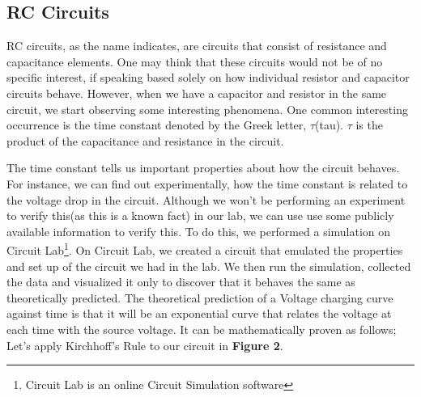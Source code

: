 \documentclass[twocolumn]{article}\usepackage[english]{babel}
\begin{document}
\subsection{RC Circuits}
RC circuits, as the name indicates, are circuits that consist of resistance and capacitance elements. One may think that these circuits would not be of no specific interest, if speaking based solely on how individual resistor and capacitor circuits behave. However, when we have a capacitor and resistor in the same circuit, we start observing some interesting phenomena. One common interesting occurrence is the time constant denoted by the Greek letter, $\tau$(tau). $\tau$ is the product of the capacitance and resistance in the circuit.
\newline
\newline
\newline
{}
\newline
\newline
\newline

The time constant tells us important properties about how the circuit behaves. For instance, we can find out experimentally, how the time constant is related to the voltage drop in the circuit. Although we won't be performing an experiment to verify this(as this is a known fact) in our lab, we can use use some publicly available information to verify this. To do this, we performed a simulation on Circuit Lab\footnote{Circuit Lab is an online Circuit Simulation software}. On Circuit Lab, we created a circuit that emulated the properties and set up of the circuit we had in the lab. We then run the simulation, collected the data and visualized it only to discover that it behaves the same as theoretically predicted.
\newline
\newline
The theoretical prediction of a Voltage charging curve against time is that it will be an exponential curve that relates the voltage at each time with the source voltage. It can be mathematically proven as follows;
Let's apply Kirchhoff's Rule to our circuit in \textbf{Figure 2}.\newline
\end{document}
